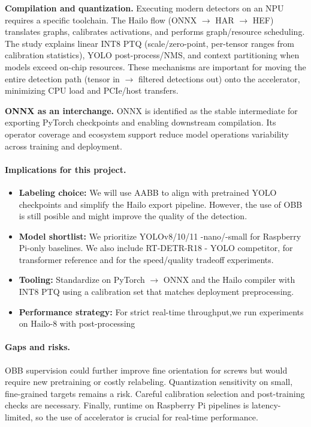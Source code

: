 \documentclass[12pt,a4paper]{report}
\begin{document}
\textbf{Compilation and quantization.}
Executing modern detectors on an NPU requires a specific toolchain. The Hailo flow
(ONNX $\rightarrow$ HAR $\rightarrow$ HEF) translates graphs, calibrates activations,
and performs graph/resource scheduling. The study explains linear INT8 PTQ
(scale/zero-point, per-tensor ranges from calibration statistics), YOLO post-process/NMS,
and context partitioning when models exceed on-chip resources.
These mechanisms are important for moving the entire detection path
(tensor in $\rightarrow$ filtered detections
out) onto the accelerator, minimizing CPU load and PCIe/host transfers.

\textbf{ONNX as an interchange.}
ONNX is identified as the stable intermediate for exporting PyTorch checkpoints and enabling downstream
compilation. Its operator coverage and ecosystem support reduce model operations variability across
training and deployment.

\paragraph{Implications for this project.}
\begin{itemize}[leftmargin=1.5em]
  \item \textbf{Labeling choice:} We will use AABB to align with pretrained YOLO checkpoints and simplify
  the Hailo export pipeline. However, the use of OBB is still posible and might improve the quality of the detection.
  \item \textbf{Model shortlist:} We prioritize YOLOv8/10/11 -nano/-small
  for Raspberry Pi-only baselines. We also include RT-DETR-R18 - YOLO competitor, for transformer reference
  and for the speed/quality tradeoff experiments.
  \item \textbf{Tooling:} Standardize on PyTorch $\rightarrow$ ONNX and the Hailo compiler with INT8 PTQ
  using a calibration set that matches deployment preprocessing.
  \item \textbf{Performance strategy:} For strict real-time throughput,we run experiments on Hailo-8 with
  post-processing
\end{itemize}

\paragraph{Gaps and risks.}
OBB supervision could further improve fine orientation for screws but would require new pretraining
or costly relabeling. Quantization sensitivity on small, fine-grained targets remains a risk. Careful
calibration selection and post-training checks are necessary.
Finally, runtime on Raspberry Pi pipelines is latency-limited, so the use of accelerator is crucial for
real-time performance.
\end{document}

